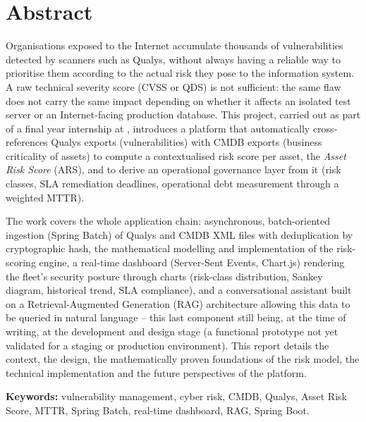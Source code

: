 \chapter*{Abstract}

Organisations exposed to the Internet accumulate thousands of vulnerabilities
detected by scanners such as Qualys, without always having a reliable way to
prioritise them according to the actual risk they pose to the information system. A
raw technical severity score (CVSS or QDS) is not sufficient: the same flaw does not
carry the same impact depending on whether it affects an isolated test server or an
Internet-facing production database. This project, carried out as part of a final
year internship at \organisme, introduces a platform that
automatically cross-references Qualys exports (vulnerabilities) with CMDB exports
(business criticality of assets) to compute a contextualised risk score per asset,
the \emph{Asset Risk Score} (ARS), and to derive an operational governance layer from
it (risk classes, SLA remediation deadlines, operational debt measurement through a
weighted MTTR).

The work covers the whole application chain: asynchronous, batch-oriented ingestion
(Spring Batch) of Qualys and CMDB XML files with deduplication by cryptographic hash,
the mathematical modelling and implementation of the risk-scoring engine, a
real-time dashboard (Server-Sent Events, Chart.js) rendering the fleet's security
posture through charts (risk-class distribution, Sankey diagram, historical trend,
SLA compliance), and a conversational assistant built on a Retrieval-Augmented
Generation (RAG) architecture allowing this data to be queried in natural language --
this last component still being, at the time of writing, at the development and
design stage (a functional prototype not yet validated for a staging or production
environment). This report details the context, the design, the mathematically proven foundations
of the risk model, the technical implementation and the future perspectives of the
platform.

\vspace{0.5cm}
\noindent\textbf{Keywords:} vulnerability management, cyber risk, CMDB, Qualys, Asset
Risk Score, MTTR, Spring Batch, real-time dashboard, RAG, Spring Boot.

\clearpage
